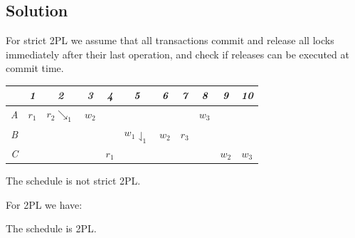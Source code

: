 \documentclass[12pt, a4paper]{report}
\begin{document}
    \subsection*{Solution}
        For strict 2PL we assume that all transactions commit and release all locks immediately after their last operation, and check if releases can be executed at commit time.
        \begin{table}[H]
            \centering
            \begin{tabular}{c|cccccccccc}
                    & \textit{1} & \textit{2} & \textit{3} & \textit{4} & \textit{5} & \textit{6} & \textit{7} & \textit{8} & \textit{9} & \textit{10} \\ \hline
            \textit{A} & $r_1$      & $r_2\searrow _1$          & $w_2$      &            &            &            &            & $w_3$      &            &             \\
            \textit{B} &            &                           &            &            & $w_1\downharpoonleft_1$      & $w_2$      & $r_3$      &            &            &             \\
            \textit{C} &            &                           &            & $r_1$      &            &            &            &            & $w_2$      & $w_3$      
            \end{tabular}%
        \end{table}
        The schedule is not strict 2PL.

        For 2PL we have:
        \begin{table}[H]
            \centering
        \end{table}
        The schedule is 2PL. 
\end{document}
